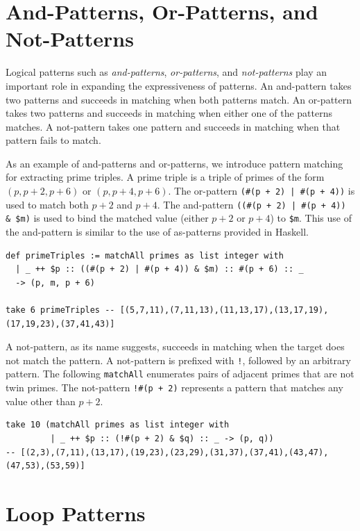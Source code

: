 \section{And-Patterns, Or-Patterns, and Not-Patterns}\label{quick-logical-pat}

Logical patterns such as \emph{and-patterns}, \emph{or-patterns}, and \emph{not-patterns} play an important role in expanding the expressiveness of patterns.
An and-pattern takes two patterns and succeeds in matching when both patterns match.
An or-pattern takes two patterns and succeeds in matching when either one of the patterns matches.
A not-pattern takes one pattern and succeeds in matching when that pattern fails to match.

As an example of and-patterns and or-patterns, we introduce pattern matching for extracting prime triples.
A prime triple is a triple of primes of the form $(p,p+2,p+6)$ or $(p,p+4,p+6)$.
The or-pattern \lstinline{(#(p + 2) | #(p + 4))} is used to match both $p+2$ and $p+4$.
The and-pattern \lstinline{((#(p + 2) | #(p + 4)) & $m)} is used to bind the matched value (either $p+2$ or $p+4$) to \lstinline{$m}.
This use of the and-pattern is similar to the use of as-patterns provided in Haskell.
\begin{lstlisting}[language=egison,numbers=none]
def primeTriples := matchAll primes as list integer with
  | _ ++ $p :: ((#(p + 2) | #(p + 4)) & $m) :: #(p + 6) :: _
  -> (p, m, p + 6)

take 6 primeTriples -- [(5,7,11),(7,11,13),(11,13,17),(13,17,19),(17,19,23),(37,41,43)]
\end{lstlisting}

A not-pattern, as its name suggests, succeeds in matching when the target does not match the pattern.
A not-pattern is prefixed with \lstinline{!}, followed by an arbitrary pattern.
The following \lstinline{matchAll} enumerates pairs of adjacent primes that are not twin primes.
The not-pattern \lstinline{!#(p + 2)} represents a pattern that matches any value other than $p+2$.
\begin{lstlisting}[language=egison,numbers=none]
take 10 (matchAll primes as list integer with
         | _ ++ $p :: (!#(p + 2) & $q) :: _ -> (p, q))
-- [(2,3),(7,11),(13,17),(19,23),(23,29),(31,37),(37,41),(43,47),(47,53),(53,59)]
\end{lstlisting}


\section{Loop Patterns}\label{quick-loop-pat}

